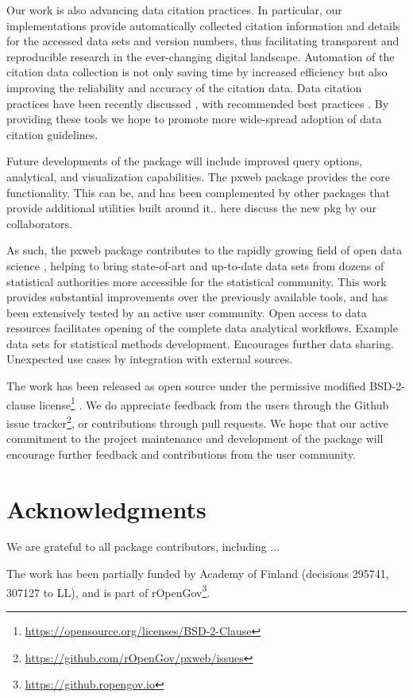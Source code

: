\documentclass[article]{jss}
\begin{document}
Our work is also advancing data citation practices. In particular, our implementations provide automatically collected citation information and details for the accessed data sets and version numbers, thus facilitating transparent and reproducible research in the ever-changing digital landscape. Automation of the citation data collection  is not only saving time by increased efficiency but also improving the reliability and accuracy of the citation data. Data citation practices have been recently discussed \cite{xxx}, with recommended best practices \cite{xxx}. By providing these tools we hope to promote more wide-spread adoption of data citation guidelines.

Future developments of the package will include improved query options, analytical, and visualization capabilities. The pxweb package provides the core functionality. This can be, and has been complemented by other packages that provide additional utilities built around it.. here discuss the new pkg by our collaborators.

As such, the pxweb package contributes to the rapidly growing field of open data science \cite{xxx}, helping to bring state-of-art and up-to-date data sets from dozens of statistical authorities more accessible for the statistical community. This work provides substantial improvements over the previously available tools, and has been extensively tested by an active user community. Open access to data resources facilitates opening of the complete data analytical workflows. Example data sets for statistical methods development. Encourages further data sharing. Unexpected use cases by integration with external sources.

The work has been released as open source under the permissive modified BSD-2-clause license\footnote{\url{https://opensource.org/licenses/BSD-2-Clause}} \cite{guide-to-scientist-programmer}. We do appreciate feedback from the users through the Github issue tracker\footnote{\url{https://github.com/rOpenGov/pxweb/issues}}, or contributions through pull requests. We hope that our active commitment to the project maintenance and development of the package will encourage further feedback and contributions from the user community.

\section*{Acknowledgments}

We are grateful to all package contributors, including ... 

The work has been partially funded by Academy of Finland (decisions 295741, 307127 to LL), and is part of rOpenGov\footnote{\url{https://github.ropengov.io}}.



\end{document}

